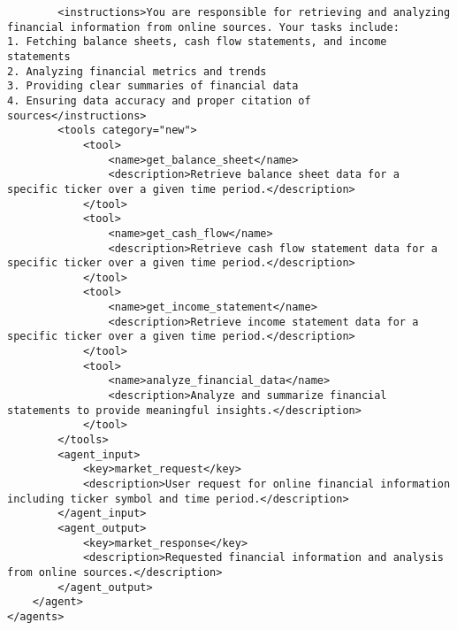 \begin{lstlisting}
        <instructions>You are responsible for retrieving and analyzing financial information from online sources. Your tasks include:
1. Fetching balance sheets, cash flow statements, and income statements
2. Analyzing financial metrics and trends
3. Providing clear summaries of financial data
4. Ensuring data accuracy and proper citation of sources</instructions>
        <tools category="new">
            <tool>
                <name>get_balance_sheet</name>
                <description>Retrieve balance sheet data for a specific ticker over a given time period.</description>
            </tool>
            <tool>
                <name>get_cash_flow</name>
                <description>Retrieve cash flow statement data for a specific ticker over a given time period.</description>
            </tool>
            <tool>
                <name>get_income_statement</name>
                <description>Retrieve income statement data for a specific ticker over a given time period.</description>
            </tool>
            <tool>
                <name>analyze_financial_data</name>
                <description>Analyze and summarize financial statements to provide meaningful insights.</description>
            </tool>
        </tools>
        <agent_input>
            <key>market_request</key>
            <description>User request for online financial information including ticker symbol and time period.</description>
        </agent_input>
        <agent_output>
            <key>market_response</key>
            <description>Requested financial information and analysis from online sources.</description>
        </agent_output>
    </agent>
</agents>
\end{lstlisting}

